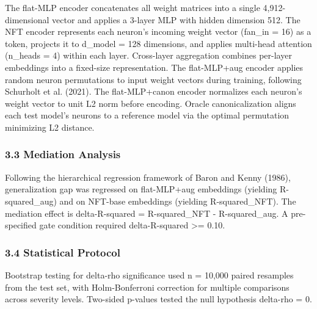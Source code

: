 The flat-MLP encoder concatenates all weight matrices into a single 4,912-dimensional vector and applies a 3-layer MLP with hidden dimension 512. The NFT encoder represents each neuron's incoming weight vector (fan\_in = 16) as a token, projects it to d\_model = 128 dimensions, and applies multi-head attention (n\_heads = 4) within each layer. Cross-layer aggregation combines per-layer embeddings into a fixed-size representation. The flat-MLP+aug encoder applies random neuron permutations to input weight vectors during training, following Schurholt et al. (2021). The flat-MLP+canon encoder normalizes each neuron's weight vector to unit L2 norm before encoding. Oracle canonicalization aligns each test model's neurons to a reference model via the optimal permutation minimizing L2 distance.

\subsubsection{3.3 Mediation Analysis}

Following the hierarchical regression framework of Baron and Kenny (1986), generalization gap was regressed on flat-MLP+aug embeddings (yielding R-squared\_aug) and on NFT-base embeddings (yielding R-squared\_NFT). The mediation effect is delta-R-squared = R-squared\_NFT - R-squared\_aug. A pre-specified gate condition required delta-R-squared >= 0.10.

\subsubsection{3.4 Statistical Protocol}

Bootstrap testing for delta-rho significance used n = 10,000 paired resamples from the test set, with Holm-Bonferroni correction for multiple comparisons across severity levels. Two-sided p-values tested the null hypothesis delta-rho = 0.

